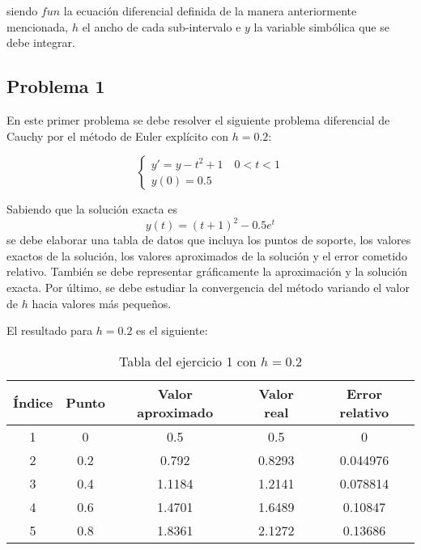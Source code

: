 siendo \(fun\) la ecuación diferencial definida de la manera anteriormente mencionada,
\(h\) el ancho de cada sub-intervalo e \(y\) la variable simbólica que se debe integrar.

\subsection{Problema 1}\label{subsec:problema-1}

En este primer problema se debe resolver el siguiente problema diferencial de Cauchy
por el método de Euler explícito con \(h = 0.2\):

\[
    \begin{cases}
        y' = y - t^2 + 1 \quad 0 < t < 1 \\
        y(0) = 0.5
    \end{cases}
\]

Sabiendo que la solución exacta es \[y(t) = (t + 1)^2 - 0.5e^t\]
se debe elaborar una tabla de datos que incluya los puntos de soporte, los valores
exactos de la solución, los valores aproximados de la solución y el error cometido relativo.
También se debe representar gráficamente la aproximación y la solución exacta.
Por último, se debe estudiar la convergencia del método variando el valor de \(h\) hacia
valores más pequeños.

El resultado para \(h = 0.2\) es el siguiente:

\begin{table}[H]
    \begin{center}
        \begin{tabular}{ |c|c|c|c|c| }
            \hline
            Índice & Punto & Valor aproximado & Valor real & Error relativo \\
            \hline
            \hline
            1      & 0     & 0.5              & 0.5        & 0              \\
            \hline
            2      & 0.2   & 0.792            & 0.8293     & 0.044976       \\
            \hline
            3      & 0.4   & 1.1184           & 1.2141     & 0.078814       \\
            \hline
            4      & 0.6   & 1.4701           & 1.6489     & 0.10847        \\
            \hline
            5      & 0.8   & 1.8361           & 2.1272     & 0.13686        \\
            \hline
        \end{tabular}
    \end{center}
    \caption{Tabla del ejercicio 1 con \(h = 0.2\)}\label{tab:euler-1-0-2}
\end{table}

